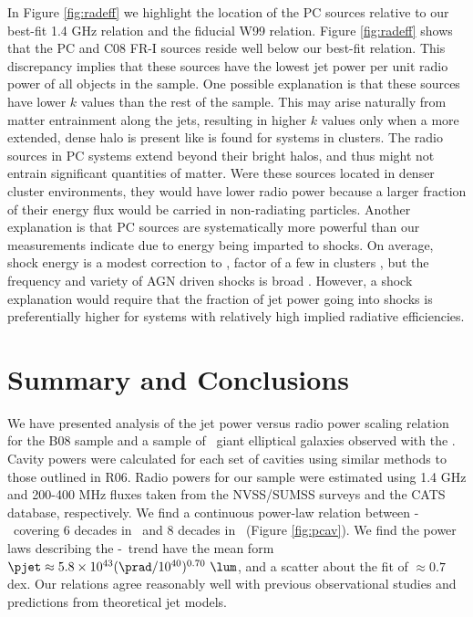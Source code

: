 \documentclass[12pt, preprint]{aastex}
\begin{document}
In Figure \ref{fig:radeff} we highlight the location of the PC sources
relative to our best-fit 1.4 GHz relation and the fiducial W99
relation. Figure \ref{fig:radeff} shows that the PC and C08 FR-I
sources reside well below our best-fit relation. This discrepancy
implies that these sources have the lowest jet power per unit radio
power of all objects in the sample. One possible explanation is that
these sources have lower $k$ values than the rest of the sample. This
may arise naturally from matter entrainment along the jets, resulting
in higher $k$ values only when a more extended, dense halo is present
like is found for systems in clusters. The radio sources in PC systems
extend beyond their bright halos, and thus might not entrain
significant quantities of matter. Were these sources located in denser
cluster environments, they would have lower radio power because a
larger fraction of their energy flux would be carried in non-radiating
particles. Another explanation is that PC sources are systematically
more powerful than our measurements indicate due to energy being
imparted to shocks. On average, shock energy is a modest correction to
\pcav, factor of a few in clusters \citep{mcnamrev}, but the frequency
and variety of AGN driven shocks is broad
\citep[\eg][]{2003ApJ...592..129K, hydraa, herca,
  2003ApJ...592..129K}. However, a shock explanation would require
that the fraction of jet power going into shocks is preferentially
higher for systems with relatively high implied radiative
efficiencies.

\section{Summary and Conclusions}
\label{sec:summary}

We have presented analysis of the jet power versus radio power scaling
relation for the B08 sample and a sample of \samp\ giant elliptical
galaxies observed with the \cxo. Cavity powers were calculated for
each set of cavities using similar methods to those outlined in
R06. Radio powers for our sample were estimated using 1.4 GHz and
200-400 MHz fluxes taken from the NVSS/SUMSS surveys and the CATS
database, respectively. We find a continuous power-law relation
between \pjet-\prad\ covering 6 decades in \prad\ and 8 decades in
\pjet\ (Figure \ref{fig:pcav}). We find the power laws describing the
\pjet-\prad\ trend have the mean form $\pjet \approx 5.8 \times
10^{43} (\prad/10^{40})^{0.70} ~\lum$, and a scatter about the fit of
$\approx 0.7$ dex. Our relations agree reasonably well with previous
observational studies and predictions from theoretical jet models.
\end{document}

